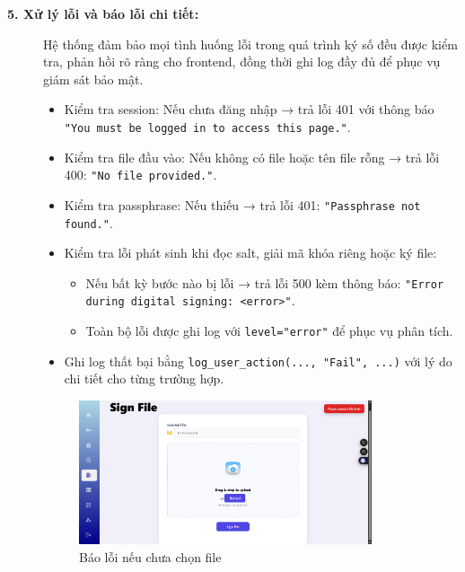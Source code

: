 \begin{description}
    \item[\textbf{5. Xử lý lỗi và báo lỗi chi tiết:}]
    Hệ thống đảm bảo mọi tình huống lỗi trong quá trình ký số đều được kiểm tra, phản hồi rõ ràng cho frontend, đồng thời ghi log đầy đủ để phục vụ giám sát bảo mật.
    \begin{itemize}
        \item Kiểm tra session: Nếu chưa đăng nhập → trả lỗi 401 với thông báo \texttt{"You must be logged in to access this page."}.
        \item Kiểm tra file đầu vào: Nếu không có file hoặc tên file rỗng → trả lỗi 400: \texttt{"No file provided."}.
        \item Kiểm tra passphrase: Nếu thiếu → trả lỗi 401: \texttt{"Passphrase not found."}.
        \item Kiểm tra lỗi phát sinh khi đọc salt, giải mã khóa riêng hoặc ký file:
        \begin{itemize}
            \item Nếu bất kỳ bước nào bị lỗi → trả lỗi 500 kèm thông báo: \texttt{"Error during digital signing: <error>"}.
            \item Toàn bộ lỗi được ghi log với \texttt{level="error"} để phục vụ phân tích.
        \end{itemize}
        \item Ghi log thất bại bằng \texttt{log\_user\_action(..., "Fail", ...)} với lý do chi tiết cho từng trường hợp.
    \end{itemize}

    \begin{figure}[H]
        \centering
        \includegraphics[width=0.85\textwidth]{img/8_sign/8_sign_fail.png}
        \caption{Báo lỗi nếu chưa chọn file}
    \end{figure}

\end{description}

